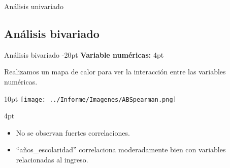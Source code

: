 \documentclass[pdf]{beamer}
\def\vspace{}%
\begin{document}
{\begin{frame}{Análisis univariado}
\end{frame}
    
    \subsection{Análisis bivariado}

\begin{frame}{Análisis bivariado}
    \vspace{-20pt}
    \textbf{Variable numéricas:}
    \vspace{4pt}

    Realizamos un mapa de calor para ver la interacción entre las variables numéricas.

    \begin{minipage}{0.46\textwidth}
        \vspace{10pt}
        \texttt{[image: ../Informe/Imagenes/ABSpearman.png]}
    \end{minipage}
    \begin{minipage}{0.46\textwidth}
        \vspace{4pt}
        \begin{itemize}
            \justifying%
            \item No se observan fuertes correlaciones.
            \item ``años\_escolaridad'' correlaciona moderadamente bien con variables relacionadas al ingreso.
        \end{itemize}
    \end{minipage}

\end{frame}
 

 

 
}
\end{document}
